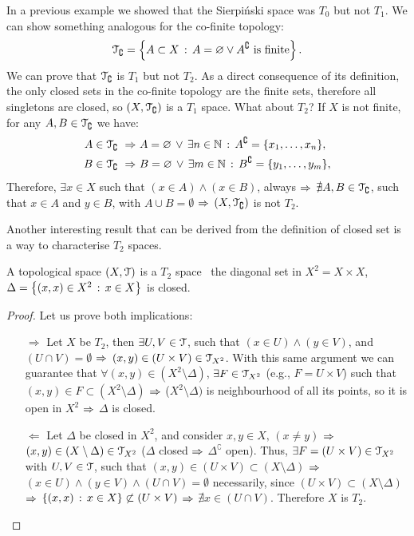 \begin{example}
	In a previous example we showed that the Sierpi\'{n}ski space was $T_0$ but not $T_1$. We can show something analogous for the co-finite topology:
	$$
	\EuScript{T}_\complement=\left\{A\subset X\,:\,A=\varnothing\lor A^\complement\text{ is finite}\right\}.
	$$
	We can prove that $\EuScript{T}_\complement$ is $T_1$ but not $T_2$. As a direct consequence of its definition, the only closed sets in the co-finite topology are the finite sets, therefore all singletons are closed, so $(X, \EuScript{T}_\complement)$ is a $T_1$ space. What about $T_2$? If $X$ is not finite, for any $A,B\in \EuScript{T}_\complement$ we have:
	\begin{align*}
		A\in\EuScript{T}_\complement\ \Rightarrow&\ A=\varnothing\,\lor\,\exists n\in \mathbb{N}\,:\,A^\complement=\{x_1,\dots,x_n\},\\
		B\in\EuScript{T}_\complement\ \Rightarrow&\ B=\varnothing\,\lor\,\exists m\in \mathbb{N}\,:\,B^\complement=\{y_1,\dots,y_m\},
	\end{align*}
	Therefore, $\exists x\in X$ such that $(x\in A)\land(x\in B)$, always $\Rightarrow$ $\nexists A,B\in \EuScript{T}_\complement$, such that $x\in A$ and $y\in B$, with $A\cup B=\emptyset$ $\Rightarrow$ $(X,\EuScript{T}_\complement)$ is not $T_2$.
\end{example}

Another interesting result that can be derived from the definition of closed set is a way to characterise $T_2$ spaces.

\begin{theorem}
	\label{th:t2-diagonal}
	A topological space $(X,\EuScript{T})$ is a $T_2$ space \iff\ the diagonal set in $X^2=X\times X$, $\Delta=\left\{(x,x)\in X^2\,:\,x\in X\right\}$ is closed.
\end{theorem}
\begin{proof}
Let us prove both implications:
\begin{itemize}
	\item[$\boxed{\Rightarrow}$] Let $X$ be $T_2$, then $\exists U,V\in \EuScript{T}$, such that $(x\in U)\land (y\in V)$, and $(U\cap V)=\emptyset$ $\Rightarrow$ $(x,y)\in (U\times V)\in\EuScript{T}_{X^2}$. With this same argument we can guarantee that $\forall (x,y)\in (X^2\setminus\Delta)$, $\exists F\in \EuScript{T}_{X^2}$ (e.g., $F=U\times V$) such that $(x,y)\in F\subset (X^2\setminus \Delta)$ $\Rightarrow$ ($X^2\setminus \Delta)$ is neighbourhood of all its points, so it is open in $X^2$ $\Rightarrow$ $\Delta$ is closed.
	\item[$\boxed{\Leftarrow}$] Let $\Delta$ be closed in $X^2$, and consider $x,y\in X,\,(x\neq y)$ $\Rightarrow$ $(x,y)\in (X\setminus\Delta)\in\EuScript{T}_{X^2}$ ($\Delta$ closed $\Rightarrow$ $\Delta^\complement$ open).
	Thus, $\exists F=(U\times V)\in \EuScript{T}_{X^2}$ with $U,V\in \EuScript{T}$, such that $(x,y)\in (U\times V)\subset (X\setminus \Delta)$ $\Rightarrow$ $(x\in U) \land (y\in V) \land (U\cap V)=\emptyset$ necessarily, since $(U\times V)\subset(X\setminus \Delta)$ $\Rightarrow$ $\left\{(x,x)\,:\,x\in X\right\}\not\subset (U\times V)$ $\Rightarrow$ $\nexists x\in (U\cap V)$. Therefore $X$ is $T_2$.
\end{itemize}
\end{proof}

